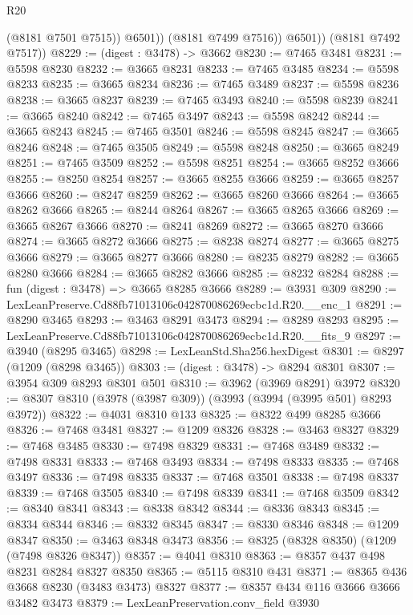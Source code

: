 \begin{lexlean}{R20}
\begin{coremodule}
                  (@8181 @7501 @7515))
                @6501))
            (@8181 @7499 @7516))
          @6501))
      (@8181 @7492 @7517))
@8229 := (digest : @3478) -> @3662
@8230 := @7465 @3481
@8231 := @5598 @8230
@8232 := @3665 @8231
@8233 := @7465 @3485
@8234 := @5598 @8233
@8235 := @3665 @8234
@8236 := @7465 @3489
@8237 := @5598 @8236
@8238 := @3665 @8237
@8239 := @7465 @3493
@8240 := @5598 @8239
@8241 := @3665 @8240
@8242 := @7465 @3497
@8243 := @5598 @8242
@8244 := @3665 @8243
@8245 := @7465 @3501
@8246 := @5598 @8245
@8247 := @3665 @8246
@8248 := @7465 @3505
@8249 := @5598 @8248
@8250 := @3665 @8249
@8251 := @7465 @3509
@8252 := @5598 @8251
@8254 := @3665 @8252 @3666
@8255 := @8250 @8254
@8257 := @3665 @8255 @3666
@8259 := @3665 @8257 @3666
@8260 := @8247 @8259
@8262 := @3665 @8260 @3666
@8264 := @3665 @8262 @3666
@8265 := @8244 @8264
@8267 := @3665 @8265 @3666
@8269 := @3665 @8267 @3666
@8270 := @8241 @8269
@8272 := @3665 @8270 @3666
@8274 := @3665 @8272 @3666
@8275 := @8238 @8274
@8277 := @3665 @8275 @3666
@8279 := @3665 @8277 @3666
@8280 := @8235 @8279
@8282 := @3665 @8280 @3666
@8284 := @3665 @8282 @3666
@8285 := @8232 @8284
@8288 := fun (digest : @3478) => @3665 @8285 @3666
@8289 := @3931 @309
@8290 := LexLeanPreserve.Cd88fb71013106c042870086269ecbc1d.R20.__enc_1
@8291 := @8290 @3465
@8293 := @3463 @8291 @3473
@8294 := @8289 @8293
@8295 := LexLeanPreserve.Cd88fb71013106c042870086269ecbc1d.R20.__fits_9
@8297 := @3940 (@8295 @3465)
@8298 := LexLeanStd.Sha256.hexDigest
@8301 := @8297 (@1209 (@8298 @3465))
@8303 := (digest : @3478) -> @8294 @8301
@8307 := @3954 @309 @8293 @8301 @501
@8310 := @3962 (@3969 @8291) @3972
@8320 := @8307 @8310 (@3978 (@3987 @309)) (@3993 (@3994 (@3995 @501) @8293 @3972))
@8322 := @4031 @8310 @133
@8325 := @8322 @499 @8285 @3666
@8326 := @7468 @3481
@8327 := @1209 @8326
@8328 := @3463 @8327
@8329 := @7468 @3485
@8330 := @7498 @8329
@8331 := @7468 @3489
@8332 := @7498 @8331
@8333 := @7468 @3493
@8334 := @7498 @8333
@8335 := @7468 @3497
@8336 := @7498 @8335
@8337 := @7468 @3501
@8338 := @7498 @8337
@8339 := @7468 @3505
@8340 := @7498 @8339
@8341 := @7468 @3509
@8342 := @8340 @8341
@8343 := @8338 @8342
@8344 := @8336 @8343
@8345 := @8334 @8344
@8346 := @8332 @8345
@8347 := @8330 @8346
@8348 := @1209 @8347
@8350 := @3463 @8348 @3473
@8356 := @8325 (@8328 @8350) (@1209 (@7498 @8326 @8347))
@8357 := @4041 @8310
@8363 := @8357 @437 @498 @8231 @8284 @8327 @8350
@8365 := @5115 @8310 @431
@8371 := @8365 @436 @3668 @8230 (@3483 @3473) @8327
@8377 := @8357 @434 @116 @3666 @3666 @3482 @3473
@8379 := LexLeanPreservation.conv_field @3930

\end{coremodule}
\end{lexlean}
